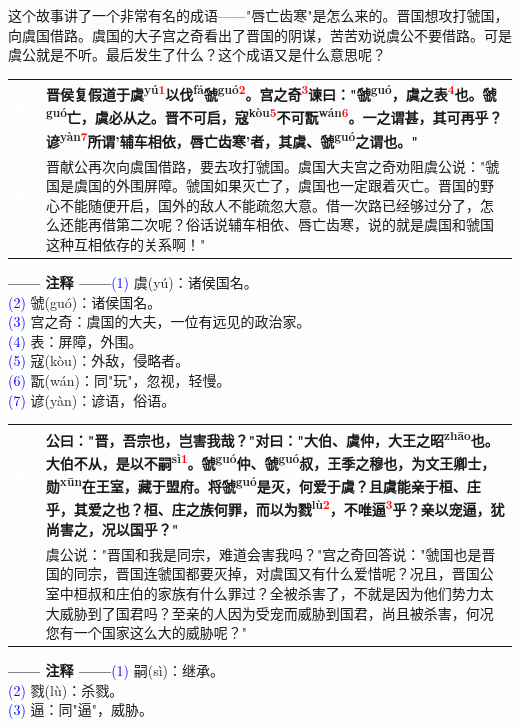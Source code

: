 \documentclass[a4paper,12pt]{ctexart}
\makeatletter
\newcommand{\ruby}[2]{#1\textsuperscript{#2}}
\newlength{\colA}\setlength{\colA}{0.06\textwidth}
\newlength{\colB}\setlength{\colB}{0.64\textwidth}
\newlength{\colC}\setlength{\colC}{0.26\textwidth}
\newcommand{\sectab}[3]{%
  \noindent
  \begin{minipage}[c]{\dimexpr\colA+\colB+2\tabcolsep\relax}
  \begin{tabular}{@{}p{\colA}p{\colB}@{}}
  \sideyuan  & {\large\bfseries #1} \\
  \sideyiwen & {\large #2} \\
  \end{tabular}
  \end{minipage}
  \hfill
  \begin{minipage}[c]{\colC}
  {\labelann\vspace{0.1cm}}#3
  \end{minipage}
  \par
}
\newcommand{\sideyuan}{\colorbox{blue!70!black}{\textcolor{white}{\normalsize\textbf{原文}}}}
\newcommand{\sideyiwen}{\colorbox{green!60!black}{\textcolor{white}{\normalsize\textbf{译文}}}}
\newcommand{\labelann}{\textcolor{orange!80!black}{\small\textbf{—— 注释 ——}}}
\newcommand{\refmark}[1]{\textsuperscript{\textcolor{red}{#1}}}
\makeatother
\begin{document}
这个故事讲了一个非常有名的成语——"唇亡齿寒"是怎么来的。晋国想攻打虢国，向虞国借路。虞国的大子宫之奇看出了晋国的阴谋，苦苦劝说虞公不要借路。可是虞公就是不听。最后发生了什么？这个成语又是什么意思呢？

\vspace{0.3cm}
\sectab{晋侯复假道于\ruby{虞}{yú}\refmark{1}以\ruby{伐}{fá}\ruby{虢}{guó}\refmark{2}。宫之奇\refmark{3}谏曰："\ruby{虢}{guó}，虞之表\refmark{4}也。\ruby{虢}{guó}亡，虞必从之。晋不可启，\ruby{寇}{kòu}\refmark{5}不可\ruby{翫}{wán}\refmark{6}。一之谓甚，其可再乎？\ruby{谚}{yàn}\refmark{7}所谓'辅车相依，唇亡齿寒'者，其虞、\ruby{虢}{guó}之谓也。"}{晋献公再次向虞国借路，要去攻打虢国。虞国大夫宫之奇劝阻虞公说："虢国是虞国的外围屏障。虢国如果灭亡了，虞国也一定跟着灭亡。晋国的野心不能随便开启，国外的敌人不能疏忽大意。借一次路已经够过分了，怎么还能再借第二次呢？俗话说辅车相依、唇亡齿寒，说的就是虞国和虢国这种互相依存的关系啊！"}{{\small \textcolor{blue}{(1)} 虞(yú)：诸侯国名。}\\[0.1cm]{\small \textcolor{blue}{(2)} 虢(guó)：诸侯国名。}\\[0.1cm]{\small \textcolor{blue}{(3)} 宫之奇：虞国的大夫，一位有远见的政治家。}\\[0.1cm]{\small \textcolor{blue}{(4)} 表：屏障，外围。}\\[0.1cm]{\small \textcolor{blue}{(5)} 寇(kòu)：外敌，侵略者。}\\[0.1cm]{\small \textcolor{blue}{(6)} 翫(wán)：同"玩"，忽视，轻慢。}\\[0.1cm]{\small \textcolor{blue}{(7)} 谚(yàn)：谚语，俗语。}}

\vspace{0.3cm}
\sectab{公曰："晋，吾宗也，岂害我哉？"对曰："大伯、虞仲，大王之\ruby{昭}{zhāo}也。大伯不从，是以不\ruby{嗣}{sì}\refmark{1}。\ruby{虢}{guó}仲、\ruby{虢}{guó}叔，王季之穆也，为文王卿士，\ruby{勋}{xūn}在王室，藏于盟府。将\ruby{虢}{guó}是灭，何爱于虞？且虞能亲于桓、庄乎，其爱之也？桓、庄之族何罪，而以为\ruby{戮}{lù}\refmark{2}，不唯逼\refmark{3}乎？亲以宠逼，犹尚害之，况以国乎？"}{虞公说："晋国和我是同宗，难道会害我吗？"宫之奇回答说："虢国也是晋国的同宗，晋国连虢国都要灭掉，对虞国又有什么爱惜呢？况且，晋国公室中桓叔和庄伯的家族有什么罪过？全被杀害了，不就是因为他们势力太大威胁到了国君吗？至亲的人因为受宠而威胁到国君，尚且被杀害，何况您有一个国家这么大的威胁呢？"}{{\small \textcolor{blue}{(1)} 嗣(sì)：继承。}\\[0.1cm]{\small \textcolor{blue}{(2)} 戮(lù)：杀戮。}\\[0.1cm]{\small \textcolor{blue}{(3)} 逼：同"逼"，威胁。}}
\end{document}
